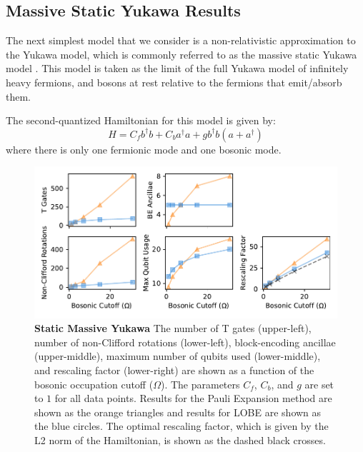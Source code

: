 \subsection{Massive Static Yukawa Results}
\label{sec:static_yukawa}

The next simplest model that we consider is a non-relativistic approximation to the Yukawa model, which is commonly referred to as the massive static Yukawa model \cite{PhysRevD.103.014021}.
This model is taken as the limit of the full Yukawa model of infinitely heavy fermions, and bosons at rest relative to the fermions that emit/absorb them.

The second-quantized Hamiltonian for this model is given by:
\begin{equation}
    \label{eq:static-yukawa}
    H = C_f b^\dagger b + C_b a^\dagger a + g b^\dagger b \left( a + a^\dagger \right)
\end{equation}
where there is only one fermionic mode and one bosonic mode. 

\begin{figure}
    \label{fig:static_yukawa}
    \includegraphics[width = 16cm]{figures/static_yukawa.pdf}
    \caption{
        \textbf{Static Massive Yukawa}
        The number of T gates (upper-left), number of non-Clifford rotations (lower-left), block-encoding ancillae (upper-middle), maximum number of qubits used (lower-middle), and rescaling factor (lower-right) are shown as a function of the bosonic occupation cutoff ($\Omega$).
        The parameters $C_f$, $C_b$, and $g$ are set to $1$ for all data points.
        Results for the Pauli Expansion method are shown as the orange triangles and results for LOBE are shown as the blue circles.
        The optimal rescaling factor, which is given by the L2 norm of the Hamiltonian, is shown as the dashed black crosses.
    }
\end{figure}

